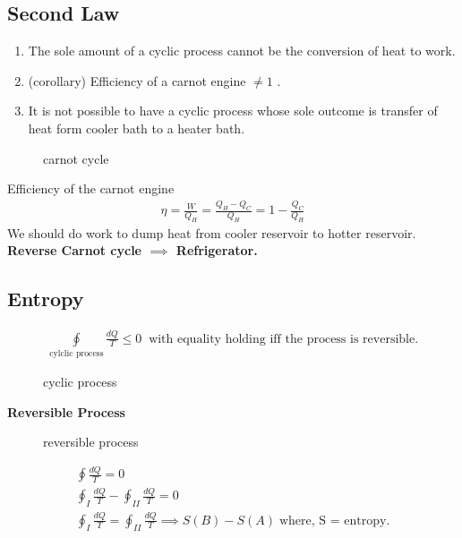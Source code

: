 \subsection{Second Law}
\begin{definition}
    \begin{enumerate}
        \item The sole amount of a cyclic process cannot be the conversion of heat to work. 
        \item (corollary) Efficiency of a carnot engine \(\neq  1\) . 
        \item It is not possible to have a cyclic process whose sole outcome is transfer of heat form cooler bath to a heater bath.
    \end{enumerate}
\end{definition}
\begin{figure}[H]
    \centering
    \caption{carnot cycle}
    \label{fig:carnot}
\end{figure}
Efficiency of the carnot engine 
\begin{gather}
    \eta = \frac{W}{Q_H} = \frac{Q_H - Q_C}{Q_H} = 1-\frac{Q_C}{Q_H}
\end{gather}
We should do work to dump heat from cooler reservoir to hotter reservoir.\\ \textbf{Reverse Carnot cycle \(\implies \) Refrigerator.} 
\subsection*{Entropy}
\begin{proposition}
    \begin{gather}
        \oint \limits_{\text{cylclic process}} \frac{dQ}{T} \leq 0 \; \; \text{with equality holding iff the process is reversible.}
    \end{gather}
    \begin{figure}[H]
        \centering
        \caption{cyclic process}
        \label{fig:Claussius}
    \end{figure}
\end{proposition}
\begin{definition}[Entropy]
    \textbf{Reversible Process}
    \begin{figure}[H]
        \centering
        \caption{reversible process}
        \label{fig:revpro}
    \end{figure}
    \begin{gather}
    \oint \frac{dQ}{T} = 0 \\
    \oint_I \frac{dQ}{T} - \oint_{II} \frac{dQ}{T} = 0 \\
    \oint_I \frac{dQ}{T} = \oint_{II} \frac{dQ}{T} \implies S(B) - S(A)\; \text{where, S = entropy}. 
    \end{gather}
\end{definition}
